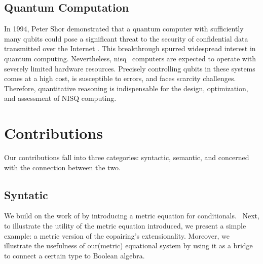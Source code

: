 \subsection*{Quantum Computation}

In 1994, Peter Shor demonstrated that a quantum computer with sufficiently many qubits could pose a significant threat to the security of confidential data transmitted over the Internet \cite{shor1994algorithms}. This breakthrough spurred widespread interest in quantum computing. Nevertheless, \acrfull{nisq}  computers are expected to operate with severely limited hardware resources. Precisely controlling qubits in these systems comes at a high cost, is susceptible to errors, and faces scarcity challenges. Therefore, quantitative reasoning is indispensable for the design, optimization, and assessment of NISQ computing. 







\section{Contributions}

Our contributions fall into three categories: syntactic, semantic, and  concerned with the connection between the two.

\subsection*{Syntatic}

We build on the work of \cite{dahlqvist2023syntactic} by introducing a metric equation for conditionals.  Next, to illustrate the utility of the metric equation introduced, we present a simple example: a metric version of the copairing's extensionality. 
Moreover, we illustrate the usefulness of our(metric) equational system by using it as a bridge to connect a certain type to Boolean algebra.


